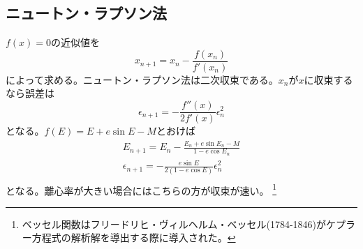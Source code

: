 	\subsection{ニュートン・ラプソン法}
		$f(x) = 0$の近似値を
			\[x_{n+1} = x_n - \frac{f(x_n)}{f'(x_n)}\]
		によって求める。ニュートン・ラプソン法は二次収束である。$x_n$が$x$に収束するなら誤差は
			\[\epsilon_{n+1} = - \frac{f''(x)}{2f'(x)}\epsilon_n^2\]
		となる。$f(E) = E + e\sin E - M$とおけば
		\begin{gather*}
			E_{n+1} = E_n - \frac{E_n + e\sin E_n - M}{1 - e\cos E_n}\\
			\epsilon_{n+1} = - \frac{e\sin E}{2(1 - e\cos E)}\epsilon_n^2\\
		\end{gather*}
		となる。離心率が大きい場合にはこちらの方が収束が速い。
\footnote{
	ベッセル関数はフリードリヒ・ヴィルヘルム・ベッセル(1784-1846)がケプラー方程式の解析解を導出する際に導入された。
}